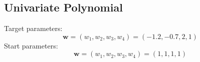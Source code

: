 \subsection{Univariate Polynomial}
Target parameters:
\[
	\bm{w} = (w_1, w_2, w_3, w_4) = ( -1.2, -0.7, 2, 1 )
\]
Start parameters:
\[
	\bm{w} = (w_1, w_2, w_3, w_4) = ( 1, 1, 1, 1 )
\]



\begin{comment}


\subsection{Univariate Polynomial}
ULA epsilon = 1e-1 -> NaN cascade
ULA epsilon = 1e-4 -> NaN cascade

While there is a lot of theory developed for stochastic processes, 
the complexity contributed by the components of the learning procedure makes it very hard to derive the parameter process analytically.
Even assuming that the samplers for the model provide bona fide samples of the model distribution, 
the randomness of the model samples and of the batch selection comes in in the form of gradients of the likelihood.
It is then warped by the optimisation procedure, which could itself be stochastic algorithm.


Hence there are a lot of dependencies and the evaluation here is empirical and, due to the vast space of hyper parameters and potential choices in strategy,
necessarily not comprehensive.


\subsection{Effect of the Sampler-Stepsize} 

The more we decrease $\varepsilon$ the smaller the steps we take in the sampler iterations.
One effect is that it is more likely to get stuck in a vast mode, depending on the distribution.
Another effect is that we decrease the contribution of the gradient compared to the contribution of the random fluctuations.
This is because the square root makes values significantly larger the closer $x$ is to 0.
When considering the stochastic process, which we discretise, this makes intuitive sense.
The more we zoom into the graph of a realisation of an Ito process, the less 'visible' the effect of the drift term becomes, 
and the more pronounced one can observe the erratic behaviour of the Wiener process term.


\end{comment}
